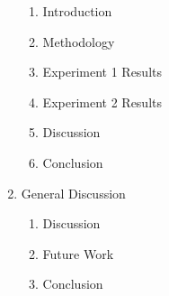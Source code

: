 \documentclass[10pt, letterpaper, twoside, openany]{book}
\begin{document}
\begin{enumerate}
	\begin{enumerate}
		\item Introduction
		\item Methodology
		\item Experiment 1 Results
		\item Experiment 2 Results
		\item Discussion
		\item Conclusion
	\end{enumerate}
	\item General Discussion
	\begin{enumerate}
		\item Discussion
		\item Future Work
		\item Conclusion
	\end{enumerate}
\end{enumerate}
\end{document}
